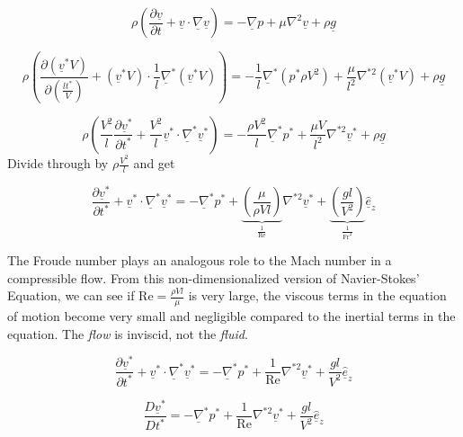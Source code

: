 \begin{equation*}
  \rho\left(\frac{\partial\underline{v}}{\partial{}t}+\underline{v}\cdot\underline{\nabla}\underline{v}\right)=-\underline{\nabla}p+\mu\nabla^{2}\underline{v}+\rho\underline{g}
\end{equation*}

\begin{equation*}
  \rho\left(\frac{\partial(\underline{v}^{*}V)}{\partial(\frac{lt^{*}}{V})}+(\underline{v}^{*}V)\cdot\frac{1}{l}\underline{\nabla}^{*}(\underline{v}^{*}V)\right)=-\frac{1}{l}\underline{\nabla}^{*}(p^{*}\rho{}V^{2})+\frac{\mu}{l^{2}}\nabla^{*2}(\underline{v}^{*}V)+\rho\underline{g}
\end{equation*}

\begin{equation*}
  \rho\left(\frac{V^{2}}{l}\frac{\partial\underline{v}^{*}}{\partial{}t^{*}}+\frac{V^{2}}{l}\underline{v}^{*}\cdot\underline{\nabla}^{*}\underline{v}^{*}\right)=-\frac{\rho{}V^{2}}{l}\underline{\nabla}^{*}p^{*}+\frac{\mu{}V}{l^{2}}\nabla^{*2}\underline{v}^{*}+\rho\underline{g}
\end{equation*}
Divide through by $\rho\frac{V^{2}}{l}$ and get

\begin{equation*}
  \frac{\partial\underline{v}^{*}}{\partial{}t^{*}}+\underline{v}^{*}\cdot\underline{\nabla}^{*}\underline{v}^{*}=-\underline{\nabla}^{*}p^{*}+\underbrace{\left(\frac{\mu}{\rho{}Vl}\right)}_{\frac{1}{\text{Re}}}\nabla^{*2}\underline{v}^{*}+\underbrace{\left(\frac{gl}{V^{2}}\right)}_{\frac{1}{\text{Fr}^{2}}}\underline{\hat{e}}_{z}
\end{equation*}

The Froude number plays an analogous role to the Mach number in a compressible flow.
From this non-dimensionalized version of Navier-Stokes' Equation, we can see if $\text{Re}=\frac{\rho{}Vl}{\mu}$ is very large, the viscous terms in the equation of motion become very small and negligible compared to the inertial terms in the equation.
The \textit{flow} is inviscid, not the \textit{fluid}.

\begin{equation*}
  \frac{\partial\underline{v}^{*}}{\partial{}t^{*}}+\underline{v}^{*}\cdot\underline{\nabla}^{*}\underline{v}^{*}=-\underline{\nabla}^{*}p^{*}+\frac{1}{\text{Re}}\nabla^{*2}\underline{v}^{*}+\frac{gl}{V^{2}}\underline{\hat{e}}_{z}
\end{equation*}

\begin{equation*}
  \frac{D\underline{v}^{*}}{Dt^{*}}=-\underline{\nabla}^{*}p^{*}+\frac{1}{\text{Re}}\nabla^{*2}\underline{v}^{*}+\frac{gl}{V^{2}}\underline{\hat{e}}_{z}
\end{equation*}

